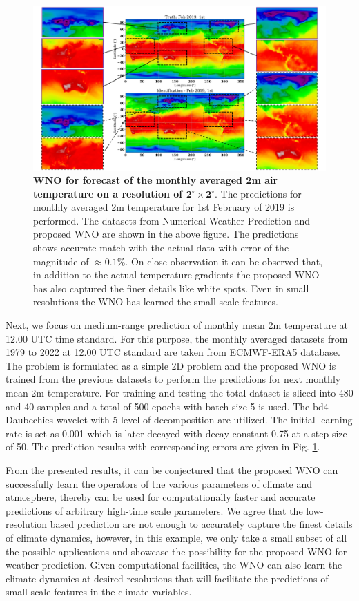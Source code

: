 \documentclass{article}
\begin{document}
\begin{figure}[ht!]
	\centering
	\includegraphics[width=\textwidth]{climate_monthly.pdf}
	\caption{\textbf{WNO for forecast of the monthly averaged 2m air temperature on a resolution of ${\mathbf{2^{\circ} \times 2^{\circ}}}$}. The predictions for monthly averaged 2m temperature for 1st February of 2019 is performed. The datasets from Numerical Weather Prediction and proposed WNO are shown in the above figure. The predictions shows accurate match with the actual data with error of the magnitude of $\approx 0.1 \%$. On close observation it can be observed that, in addition to the actual temperature gradients the proposed WNO has also captured the finer details like white spots. Even in small resolutions the WNO has learned the small-scale features.}
	\label{fig_era5}
\end{figure}

Next, we focus on medium-range prediction of monthly mean 2m temperature at 12.00 UTC time standard. For this purpose, the monthly averaged datasets from 1979 to 2022 at 12.00 UTC standard are taken from ECMWF-ERA5 database. The problem is formulated as a simple 2D problem and the proposed WNO is trained from the previous datasets to perform the predictions for next monthly mean 2m temperature. For training and testing the total dataset is sliced into 480 and 40 samples and a total of 500 epochs with batch size 5 is used. The bd4 Daubechies wavelet with 5 level of decomposition are utilized. The initial learning rate is set as 0.001 which is later decayed with decay constant 0.75 at a step size of 50. The prediction results with corresponding errors are given in Fig. \ref{fig_era5}. 

From the presented results, it can be conjectured that the proposed WNO can successfully learn the operators of the various parameters of climate and atmosphere, thereby can be used for computationally faster and accurate predictions of arbitrary high-time scale parameters. We agree that the low-resolution based prediction are not enough to accurately capture the finest details of climate dynamics, however, in this example, we only take a small subset of all the possible applications and showcase the possibility for the proposed WNO for weather prediction. Given computational facilities, the WNO can also learn the climate dynamics at desired resolutions that will facilitate the predictions of small-scale features in the climate variables.
\end{document}
